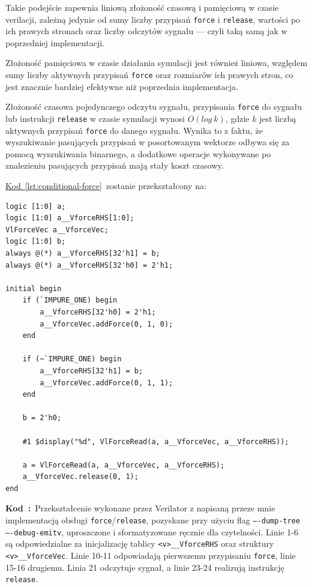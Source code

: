 \documentclass[shortabstract, inz]{iithesis}
\newcounter{kod}[chapter]
\renewcommand{\thekod}{\thechapter\arabic{kod}}
\newcommand{\codecaption}[2]{%
  \par\refstepcounter{kod}\label{#1}%
  \noindent\textbf{Kod~\thekod:}~#2\par
  \vspace*{1.0\baselineskip}%
}
\newcommand{\coderef}[1]{\hyperref[#1]{Kod~\ref*{#1}}}
\begin{document}
Takie podejście zapewnia liniową złożoność czasową i pamięciową w czasie verilacji, zależną jedynie od sumy liczby przypisań \texttt{force} i \texttt{release}, wartości po ich prawych stronach oraz liczby odczytów sygnału --- czyli taką samą jak w poprzedniej implementacji.

Złożoność pamięciowa w czasie działania symulacji jest również liniowa, względem sumy liczby aktywnych przypisań \texttt{force} oraz rozmiarów ich prawych stron, co jest znacznie bardziej efektywne niż poprzednia implementacja.

Złożoność czasowa pojedynczego odczytu sygnału, przypisania \texttt{force} do sygnału lub instrukcji \texttt{release} w czasie symulacji wynosi $O(log\ k)$, gdzie $k$ jest liczbą aktywnych przypisań \texttt{force} do danego sygnału. Wynika to z faktu, że wyszukiwanie pasujących przypisań w posortowanym wektorze odbywa się za pomocą wyszukiwania binarnego, a dodatkowe operacje wykonywane po znalezieniu pasujących przypisań mają stały koszt czasowy.

\coderef{lst:conditional-force}~zostanie przekształcony na:
\begin{verbatim}
logic [1:0] a;
logic [1:0] a__VforceRHS[1:0];
VlForceVec a__VforceVec;
logic [1:0] b;
always @(*) a__VforceRHS[32'h1] = b;
always @(*) a__VforceRHS[32'h0] = 2'h1;

initial begin
    if (`IMPURE_ONE) begin
        a__VforceRHS[32'h0] = 2'h1;
        a__VforceVec.addForce(0, 1, 0);
    end

    if (~`IMPURE_ONE) begin
        a__VforceRHS[32'h1] = b;
        a__VforceVec.addForce(0, 1, 1);
    end

    b = 2'h0;

    #1 $display("%d", VlForceRead(a, a__VforceVec, a__VforceRHS));

    a = VlForceRead(a, a__VforceVec, a__VforceRHS);
    a__VforceVec.release(0, 1);
end
\end{verbatim}
\codecaption{lst:force-cpp}{Przekształcenie wykonane przez Verilator z napisaną przeze mnie implementacją obsługi \texttt{force}/\texttt{release}, pozyskane przy użyciu flag \texttt{----dump-tree ----debug-emitv}, uproszczone i sformatyzowane ręcznie dla czytelności. Linie 1-6 są odpowiedzialne za inicjalizację tablicy \texttt{<v>\_\_VforceRHS} oraz struktury \texttt{<v>\_\_VforceVec}. Linie 10-11 odpowiadają pierwszemu przypisaniu \texttt{force}, linie 15-16 drugiemu. Linia 21 odczytuje sygnał, a linie 23-24 realizują instrukcję \texttt{release}.}
\end{document}
